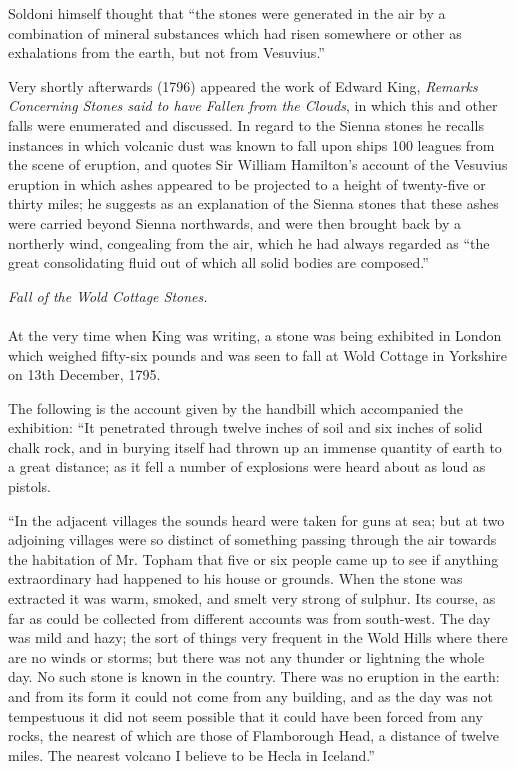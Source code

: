 \documentclass[a4paper, 11pt, oneside]{article}
\begin{document}
Soldoni himself thought that ``the stones were generated in the air by a combination of mineral substances which had risen somewhere or other as exhalations from the earth, but not from Vesuvius.''

Very shortly afterwards (1796) appeared the work of Edward King, \emph{Remarks Concerning Stones said to have Fallen from the Clouds}, in which this and other falls were enumerated and discussed. In regard to the Sienna stones he recalls instances in which volcanic dust was known to fall upon ships 100 leagues from the scene of eruption, and quotes Sir William Hamilton's account of the Vesuvius eruption in which ashes appeared to be projected to a height of twenty-five or thirty miles; he suggests as an explanation of the Sienna stones that these ashes were carried beyond Sienna northwards, and were then brought back by a northerly wind, congealing from the air, which he had always regarded as ``the great consolidating fluid out of which all solid bodies are composed.'' 
\begin{center}
\emph{Fall of the Wold Cottage Stones.}
\end{center}
\paragraph{}
At the very time when King was writing, a stone was being exhibited in London which weighed fifty-six pounds and was seen to fall at Wold Cottage in Yorkshire on 13th December, 1795. 

The following is the account given by the handbill which accompanied the exhibition: ``It penetrated through twelve inches of soil and six inches of solid chalk rock, and in burying itself had thrown up an immense quantity of earth to a great distance; as it fell a number of explosions were heard about as loud as pistols. 

``In the adjacent villages the sounds heard were taken for guns at sea; but at two adjoining villages were so distinct of something passing through the air towards the habitation of Mr. Topham that five or six people came up to see if anything extraordinary had happened to his house or grounds. When the stone was extracted it was warm, smoked, and smelt very strong of sulphur. Its course, as far as could be collected from different accounts was from south-west. The day was mild and hazy; the sort of things very frequent in the Wold Hills where there are no winds or storms; but there was not any thunder or lightning the whole day. No such stone is known in the country. There was no eruption in the earth: and from its form it could not come from any building, and as the day was not tempestuous it did not seem possible that it could have been forced from any rocks, the nearest of which are those of Flamborough Head, a distance of twelve miles. The nearest volcano I believe to be Hecla in Iceland.'' 
\end{document}
